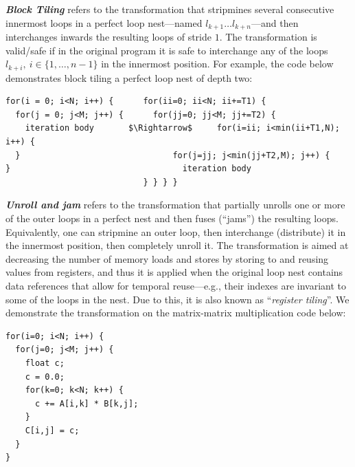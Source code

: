 \documentclass[acmsmall,review]{acmart}\settopmatter{printfolios=true,printccs=false,printacmref=false}
\begin{document}
\textbf{\em Block Tiling} refers to the transformation that
    stripmines several consecutive innermost loops in a 
    perfect loop nest---named $l_{k+1}\ldots l_{k+n}$---and then 
    interchanges inwards the resulting loops of stride $1$.
    The transformation is valid/safe if in the original program
    it is safe to interchange any of the loops 
    $l_{k+i},~i\in\{1,\ldots,n-1\}$ in the innermost position.
    For example, the code below demonstrates block tiling a perfect 
    loop nest of depth two:
\begin{lstlisting}[mathescape=true]
for(i = 0; i<N; i++) {      for(ii=0; ii<N; ii+=T1) {
  for(j = 0; j<M; j++) {      for(jj=0; jj<M; jj+=T2) {        
    iteration body       $\Rightarrow$     for(i=ii; i<min(ii+T1,N); i++) {
  }                               for(j=jj; j<min(jj+T2,M); j++) {
}                                   iteration body
                            } } } }
\end{lstlisting}

\textbf{\em Unroll and jam} refers to the transformation that partially
unrolls one or more of the outer loops in a perfect nest and then
fuses (``jams'') the resulting loops. Equivalently, one can stripmine
an outer loop, then interchange (distribute) it in the innermost 
position, then completely unroll it. The transformation is aimed at 
decreasing the number of memory loads and stores by storing to and 
reusing values from registers, and thus it is applied when the 
original loop nest contains data references that allow for temporal 
reuse---e.g., their indexes are invariant to some of the loops 
in the nest. 
Due to this, it is also known as ``{\em register tiling}''.  
We demonstrate the transformation on the matrix-matrix
multiplication code below:
\begin{lstlisting}[mathescape=true]
for(i=0; i<N; i++) {
  for(j=0; j<M; j++) {
    float c;
    c = 0.0;
    for(k=0; k<N; k++) {
      c += A[i,k] * B[k,j];
    }
    C[i,j] = c;
  }
}
\end{lstlisting}
\end{document}
